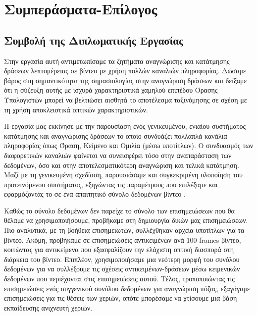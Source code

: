 \documentclass[11pt,a4paper,english,greek,twoside]{../Thesis}
\begin{document}
\chapter{Συμπεράσματα-Επίλογος}
\section{Συμβολή της Διπλωματικής Εργασίας}
Στην εργασία αυτή αντιμετωπίσαμε τα ζητήματα αναγνώρισης και κατάτμησης δράσεων λεπτομέρειας σε βίντεο με χρήση πολλών καναλιών πληροφορίας. Δώσαμε βάρος στη σημαντικότητα της σημασιολογίας στην αναγνώριση δράσεων και δείξαμε ότι η σύζευξη αυτής με ισχυρά χαρακτηριστικά χαμηλού επιπέδου Όρασης Υπολογιστών μπορεί να βελτιώσει αισθητά το αποτέλεσμα ταξινόμησης σε σχέση με τη χρήση αποκλειστικά οπτικών χαρακτηριστικών.

\par Η εργασία μας εκκίνησε με την παρουσίαση ενός γενικευμένου, ενιαίου συστήματος κατάτμησης και αναγνώρισης δράσεων το οποίο συνδυάζει πολλαπλά κανάλια πληροφορίας όπως Όραση, Κείμενο και Ομιλία (μέσω υποτίτλων). Ο συνδυασμός των διαφορετικών καναλιών φαίνεται να συνεισφέρει τόσο στην αναπαράσταση των δεδομένων, όσο και στην αποτελεσματικότερη αναγνώριση και τελικά κατάτμηση. Μαζί με τη γενικευμένη σχεδίαση, παρουσιάσαμε και συγκεκριμένη υλοποίηση του προτεινόμενου συστήματος, εξηγώντας τις παραμέτρους που επιλέξαμε και εφαρμόζοντάς το σε ένα απαιτητικό σύνολο δεδομένων βίντεο \cite{rohrbach_2012}.

\par Καθώς το σύνολο δεδομένων δεν παρείχε το σύνολο των επισημειώσεων που θα θέλαμε να χρησιμοποιήσουμε, προβήκαμε στη δημιουργία δικών μας επισημειώσεων. Πιο αναλυτικά, με τη βοήθεια επισημειωτών, συλλέχθηκαν αρχεία υποτίτλων για τα βίντεο. Ακόμη, προβήκαμε σε επισημειώσεις αντικειμένων ανά 100 frames βίντεο, κοιτώντας για αντικείμενα που εξασφαλίζουν την ελάχιστη οπτική διασπορά στη διάρκεια του βίντεο. Επιπλέον, χρησιμοποιήσαμε μια νεότερη μορφή του συνόλου δεδομένων \cite{rohrbach_2015} για να συλλέξουμε τις σχέσεις αντικειμένων-δράσεων μέσω κειμενικών δεδομένων που περιέχονται στις επισημειώσεις αυτού. Τέλος, τροποποιώντας τις επισημειώσεις ενός συγγενικού συνόλου δεδομένων \cite{amin_2013} για αναγνώριση πόζας, εξαγάγαμε επισημειώσεις για τις θέσεις των χεριών, οπότε μπορέσαμε να χτίσουμε μια βάση εκπαίδευσης ανιχνευτή χεριών.
\end{document}
